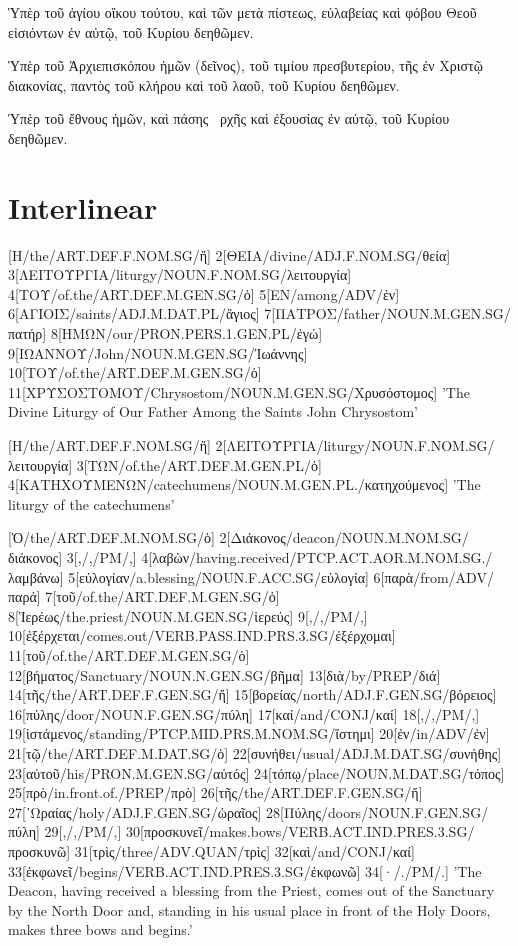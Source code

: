 \documentclass[extrafontsizes,17pt]{memoir}
\begin{document}
\a 

Ὑπὲρ τοῦ ἁγίου οἴκου τούτου, καὶ τῶν μετὰ πίστεως, εὐλαβείας καὶ φόβου Θεοῦ εἰσιόντων ἐν αὐτῷ, τοῦ Κυρίου δεηθῶμεν.

\a

Ὑπὲρ τοῦ Ἀρχιεπισκόπου ἡμῶν (δεῖνος), τοῦ τιμίου πρεσβυτερίου, τῆς ἐν Χριστῷ διακονίας, παντὸς τοῦ κλήρου καὶ τοῦ λαοῦ, τοῦ Κυρίου δεηθῶμεν.

\a 

Ὑπὲρ τοῦ ἔθνους ἡμῶν, καὶ πάσης  ρχῆς καὶ ἐξουσίας ἐν αὐτῷ, τοῦ Κυρίου δεηθῶμεν.

\xe

\section{Interlinear}

\begingroup


\pex

\a

[H/the/ART.DEF.F.NOM.SG/ἤ]
2[ΘΕΙΑ/divine/ADJ.F.NOM.SG/θεία]
3[ΛΕΙΤΟΥΡΓΙΑ/liturgy/NOUN.F.NOM.SG/λειτουργία]
4[ΤΟΥ/of.the/ART.DEF.M.GEN.SG/ὁ]
5[ΕΝ/among/ADV/ἐν]
6[ΑΓΙΟΙΣ/saints/ADJ.M.DAT.PL/ἅγιος]
7[ΠΑΤΡΟΣ/father/NOUN.M.GEN.SG/πατήρ]
8[ΗΜΩΝ/our/PRON.PERS.1.GEN.PL/ἐγώ]
9[ΙΩΑΝΝΟΥ/John/NOUN.M.GEN.SG/Ἰωάννης]
10[ΤΟΥ/of.the/ART.DEF.M.GEN.SG/ὁ]
11[ΧΡΥΣΟΣΤΟΜΟΥ/Chrysostom/NOUN.M.GEN.SG/Χρυσόστομος]
\glft 
'The Divine Liturgy of Our Father Among the Saints John Chrysostom'
\endgl

\a

[Η/the/ART.DEF.F.NOM.SG/ἤ]
2[ΛΕΙΤΟΥΡΓΙΑ/liturgy/NOUN.F.NOM.SG/λειτουργία]
3[ΤΩΝ/of.the/ART.DEF.M.GEN.PL/ὁ]
4[ΚΑΤΗΧΟΥΜΕΝΩΝ/catechumens/NOUN.M.GEN.PL./κατηχούμενος]
\glft 
'The liturgy of the catechumens'
\endgl

\a

[Ὁ/the/ART.DEF.M.NOM.SG/ὁ]
2[Διάκονος/deacon/NOUN.M.NOM.SG/διάκονος]
3[,/,/PM/,]
4[λαβὼν/having.received/PTCP.ACT.AOR.M.NOM.SG./λαμβάνω]
5[εὐλογίαν/a.blessing/NOUN.F.ACC.SG/εὐλογία]
6[παρὰ/from/ADV/παρά] 
7[τοῦ/of.the/ART.DEF.M.GEN.SG/ὁ] 
8[Ἱερέως/the.priest/NOUN.M.GEN.SG/ἱερεύς]
9[,/,/PM/,]
10[ἐξέρχεται/comes.out/VERB.PASS.IND.PRS.3.SG/ἐξέρχομαι]
11[τοῦ/of.the/ART.DEF.M.GEN.SG/ὁ]
12[βήματος/Sanctuary/NOUN.N.GEN.SG/βῆμα]
13[διὰ/by/PREP/διά]
14[τῆς/the/ART.DEF.F.GEN.SG/ἤ]
15[βορείας/north/ADJ.F.GEN.SG/βόρειος]
16[πύλης/door/NOUN.F.GEN.SG/πύλη]
17[καί/and/CONJ/καί]
18[,/,/PM/,]
19[ἱστάμενος/standing/PTCP.MID.PRS.M.NOM.SG/ἵστημι]
20[ἐν/in/ADV/ἐν]
21[τῷ/the/ART.DEF.M.DAT.SG/ὁ]
22[συνήθει/usual/ADJ.M.DAT.SG/συνήθης]
23[αὐτοῦ/his/PRON.M.GEN.SG/αὐτός] 
24[τόπῳ/place/NOUN.M.DAT.SG/τόπος]
25[πρὸ/in.front.of./PREP/πρὸ]
26[τῆς/the/ART.DEF.F.GEN.SG/ἤ]
27[῾Ωραίας/holy/ADJ.F.GEN.SG/ὡραῖος]
28[Πύλης/doors/NOUN.F.GEN.SG/πύλη]
29[,/,/PM/,]
30[προσκυνεῖ/makes.bows/VERB.ACT.IND.PRES.3.SG/προσκυνῶ]
31[τρὶς/three/ADV.QUAN/τρὶς]
32[καὶ/and/CONJ/καί] 
33[ἐκφωνεῖ/begins/VERB.ACT.IND.PRES.3.SG/ἐκφωνῶ]
34[·/./PM/.]
\glft
'The Deacon, having received a blessing from the Priest, comes out of the Sanctuary by the North Door and, standing in his usual place in front of the Holy Doors, makes three bows and begins.'
\endgl
\end{document}
